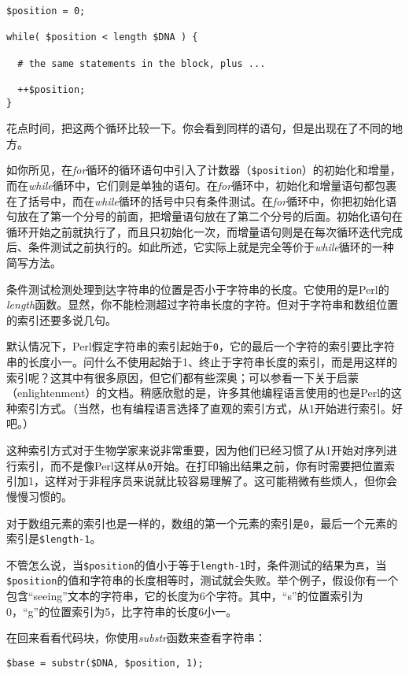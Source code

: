 \begin{lstlisting}
$position = 0;

while( $position < length $DNA ) {

  # the same statements in the block, plus ...

  ++$position;
}
\end{lstlisting}

花点时间，把这两个循环比较一下。你会看到同样的语句，但是出现在了不同的地方。

如你所见，在\textit{for}循环的循环语句中引入了计数器（\verb|$position|）的初始化和增量，而在\textit{while}循环中，它们则是单独的语句。在\textit{for}循环中，初始化和增量语句都包裹在了括号中，而在\textit{while}循环的括号中只有条件测试。在\textit{for}循环中，你把初始化语句放在了第一个分号的前面，把增量语句放在了第二个分号的后面。初始化语句在循环开始之前就执行了，而且只初始化一次，而增量语句则是在每次循环迭代完成后、条件测试之前执行的。如此所述，它实际上就是完全等价于\textit{while}循环的一种简写方法。

条件测试检测处理到达字符串的位置是否小于字符串的长度。它使用的是Perl的\textit{length}函数。显然，你不能检测超过字符串长度的字符。但对于字符串和数组位置的索引还要多说几句。

默认情况下，Perl假定字符串的索引起始于\verb|0|，它的最后一个字符的索引要比字符串的长度小一。问什么不使用起始于1、终止于字符串长度的索引，而是用这样的索引呢？这其中有很多原因，但它们都有些深奥；可以参看一下关于启蒙（enlightenment）的文档。稍感欣慰的是，许多其他编程语言使用的也是Perl的这种索引方式。（当然，也有编程语言选择了直观的索引方式，从1开始进行索引。好吧。）

这种索引方式对于生物学家来说非常重要，因为他们已经习惯了从1开始对序列进行索引，而不是像Perl这样从\verb|0|开始。在打印输出结果之前，你有时需要把位置索引加1，这样对于非程序员来说就比较容易理解了。这可能稍微有些烦人，但你会慢慢习惯的。

对于数组元素的索引也是一样的，数组的第一个元素的索引是\verb|0|，最后一个元素的索引是\verb|$length-1|。

不管怎么说，当\verb|$position|的值小于等于\verb|length-1|时，条件测试的结果为\verb|真|，当\verb|$position|的值和字符串的长度相等时，测试就会失败。举个例子，假设你有一个包含“seeing”文本的字符串，它的长度为6个字符。其中，“s”的位置索引为0，“g”的位置索引为5，比字符串的长度6小一。

在回来看看代码块，你使用\textit{substr}函数来查看字符串：

\begin{lstlisting}
$base = substr($DNA, $position, 1);
\end{lstlisting}

